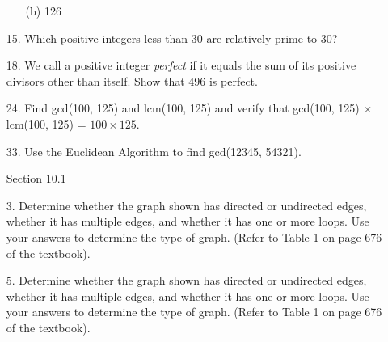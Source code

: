 \documentclass[12pt]{article}
\newcommand\bufsub{\vspace{1.0in}}
\begin{document}
\begin{enumerate}
\begin{enumerate}
    
    \item[(b)] 126
    
    
\end{enumerate}
\bufsub


\item[15.] Which positive integers less than 30 are relatively prime to 30?
\newpage


\item[18.] We call a positive integer \emph{perfect} if it equals the sum of its positive divisors other than itself. Show that 496 is perfect.
\bufsub


\item[24.] Find gcd(100, 125) and lcm(100, 125) and verify that gcd(100, 125) $\times$ lcm(100, 125) = $100 \times 125$.
\bufsub


\item[33.] Use the Euclidean Algorithm to find gcd(12345, 54321).

\newpage

\begin{center}
    {\large Section 10.1}
\end{center}


\item[3.] Determine whether the graph shown has directed or undirected edges, whether it has multiple edges, and whether it has one or more loops. Use your answers to determine the type of graph. (Refer to Table 1 on page 676 of the textbook).

\hspace{50.0mm}

\bufsub


\item[5.] Determine whether the graph shown has directed or undirected edges, whether it has multiple edges, and whether it has one or more loops. Use your answers to determine the type of graph. (Refer to Table 1 on page 676 of the textbook).


\end{enumerate}
\end{document}
